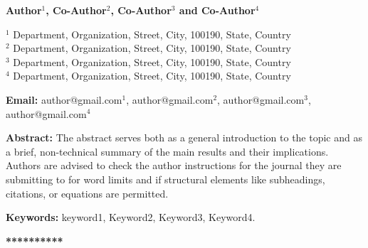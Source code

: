 \documentclass[11pt]{article}
\newcommand{\showuc}[1]{\MakeUppercase{#1}}
\begin{document}

\vspace*{-0.5cm}


\begin{center}

{\color{color2}{\large\bfseries
\showuc{Title of the Abstract}}}

\vspace{0.15cm}

{\bfseries Author$^{1}$, Co-Author$^{2}$, Co-Author$^{3}$
and Co-Author$^{4}$}

\vspace{0.08cm}

$^{1}$ Department, Organization, Street, City, 100190, State, Country\\
$^{2}$ Department, Organization, Street, City, 100190, State, Country\\
$^{3}$ Department, Organization, Street, City, 100190, State, Country\\
$^{4}$ Department, Organization, Street, City, 100190, State, Country

\vspace{0.08cm}

{\bfseries Email:}
author@gmail.com$^1$,
author@gmail.com$^2$,
author@gmail.com$^3$,
author@gmail.com$^4$

\end{center}


\vspace{-0.05cm}

\noindent
{\bfseries Abstract:}
The abstract serves both as a general introduction to the topic and as a brief,
non-technical summary of the main results and their implications. Authors are
advised to check the author instructions for the journal they are submitting to
for word limits and if structural elements like subheadings, citations, or
equations are permitted.

\vspace{0.12cm}


\noindent
{\bfseries Keywords:}
keyword1, Keyword2, Keyword3, Keyword4.

\vfill

\begin{center}
{\bfseries ***********}
\end{center}
\end{document}
